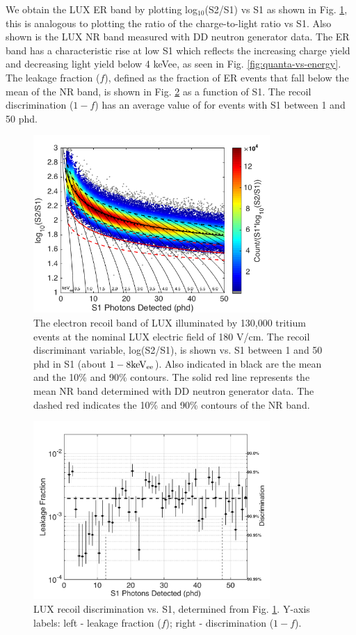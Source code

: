 We obtain the LUX ER band by plotting log$_{10}$(S2/S1) vs S1 as shown in Fig. \ref{fig:ER_band}, this is analogous to plotting the ratio of the charge-to-light ratio vs S1. Also shown is the LUX NR band measured with DD neutron generator data. The ER band has a characteristic rise at low S1 which reflects the increasing charge yield and decreasing light yield below 4 keVee, as seen in Fig. \ref{fig:quanta-vs-energy}. The leakage fraction ($f$), defined as the fraction of ER events that fall below the mean of the NR band, is shown in Fig. \ref{fig:Leak} as a function of S1. The recoil discrimination ($1-f$) has an average value of  for events with S1 between 1 and 50 phd.

\begin{figure}[h!]\centering
\includegraphics[width=90mm]{fig/CH3T_ER_Band.png}
\caption{The electron recoil band of LUX illuminated by 130,000 tritium events at the nominal LUX electric field of 180 V/cm.  The recoil discriminant variable, log(S2/S1), is shown vs. S1 between 1 and 50 phd in S1 (about $\rm1-8 keV_{ee}$). Also indicated in black are the mean and the 10\% and 90\% contours. The solid red line represents the mean NR band determined with DD neutron generator data. The dashed red indicates the 10\% and 90\% contours of the NR band.}
\label{fig:ER_band}
\end{figure}

\begin{figure}[h!]\centering
\includegraphics[width=90mm]{fig/CH3T_Leakage_Run03.png}
\caption{LUX recoil discrimination vs. S1, determined from Fig. \ref{fig:ER_band}. Y-axis labels: left -  leakage fraction ($f$); right - discrimination ($1-f$).}
\label{fig:Leak}
\end{figure}


